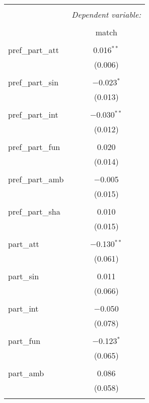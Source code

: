 
\begin{table}[!htbp] \centering 
  \caption{} 
  \label{} 
\begin{tabular}{@{\extracolsep{5pt}}lc} 
\\[-1.8ex]\hline 
\hline \\[-1.8ex] 
 & \multicolumn{1}{c}{\textit{Dependent variable:}} \\ 
\cline{2-2} 
\\[-1.8ex] & match \\ 
\hline \\[-1.8ex] 
 pref\_part\_att & 0.016$^{**}$ \\ 
  & (0.006) \\ 
  & \\ 
 pref\_part\_sin & $-$0.023$^{*}$ \\ 
  & (0.013) \\ 
  & \\ 
 pref\_part\_int & $-$0.030$^{**}$ \\ 
  & (0.012) \\ 
  & \\ 
 pref\_part\_fun & 0.020 \\ 
  & (0.014) \\ 
  & \\ 
 pref\_part\_amb & $-$0.005 \\ 
  & (0.015) \\ 
  & \\ 
 pref\_part\_sha & 0.010 \\ 
  & (0.015) \\ 
  & \\ 
 part\_att & $-$0.130$^{**}$ \\ 
  & (0.061) \\ 
  & \\ 
 part\_sin & 0.011 \\ 
  & (0.066) \\ 
  & \\ 
 part\_int & $-$0.050 \\ 
  & (0.078) \\ 
  & \\ 
 part\_fun & $-$0.123$^{*}$ \\ 
  & (0.065) \\ 
  & \\ 
 part\_amb & 0.086 \\ 
  & (0.058) \\ 
  & \\ 

\end{tabular}
\end{table}

